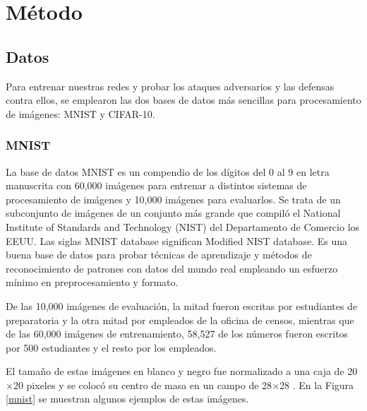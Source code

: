 \section{Método}

\subsection{Datos}
Para entrenar nuestras redes y probar los ataques adversarios y las defensas contra ellos, se emplearon las dos bases de datos más sencillas para procesamiento de imágenes: MNIST y CIFAR-10.

\subsubsection{MNIST}
La base de datos MNIST es un compendio de los dígitos del 0 al 9 en letra manuscrita con 60,000 imágenes para entrenar a distintos sistemas de procesamiento de imágenes y 10,000 imágenes para evaluarlos. Se trata de un subconjunto de imágenes de un conjunto más grande que compiló el National Institute of Standards and Technology (NIST) del Departamento de Comercio los EEUU. Las siglas MNIST database significan Modified NIST database. Es una buena base de datos para probar técnicas de aprendizaje y métodos de reconocimiento de patrones con datos del mundo real empleando un esfuerzo mínimo en preprocesamiento y formato.

De las 10,000 imágenes de evaluación, la mitad fueron escritas por estudiantes de preparatoria y la otra mitad por empleados de la oficina de censos, mientras que de las 60,000 imágenes de entrenamiento, 58,527 de los números fueron escritos por 500 estudiantes y el resto por los empleados.

El tamaño de estas imágenes en blanco y negro fue normalizado a una caja de 20$\times$20 pixeles y se colocó su centro de masa en un campo de 28$\times$28 \cite{lecun2010mnist}. En la Figura \ref{mnist} se muestran algunos ejemplos de estas imágenes.


